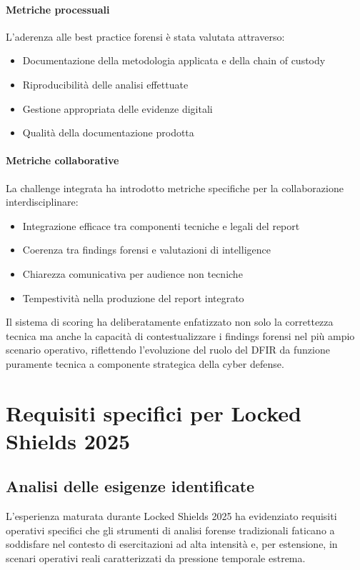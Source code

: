 \paragraph{Metriche processuali}
L'aderenza alle best practice forensi è stata valutata attraverso:
\begin{itemize}
    \item Documentazione della metodologia applicata e della chain of custody
    \item Riproducibilità delle analisi effettuate
    \item Gestione appropriata delle evidenze digitali
    \item Qualità della documentazione prodotta
\end{itemize}

\paragraph{Metriche collaborative}
La challenge integrata ha introdotto metriche specifiche per la collaborazione interdisciplinare:
\begin{itemize}
    \item Integrazione efficace tra componenti tecniche e legali del report
    \item Coerenza tra findings forensi e valutazioni di intelligence
    \item Chiarezza comunicativa per audience non tecniche
    \item Tempestività nella produzione del report integrato
\end{itemize}

Il sistema di scoring ha deliberatamente enfatizzato non solo la correttezza tecnica ma anche la capacità di contestualizzare i findings forensi nel più ampio scenario operativo, riflettendo l'evoluzione del ruolo del DFIR da funzione puramente tecnica a componente strategica della cyber defense.

\section{Requisiti specifici per Locked Shields 2025}

\subsection{Analisi delle esigenze identificate}

L'esperienza maturata durante Locked Shields 2025 ha evidenziato requisiti operativi specifici che gli strumenti di analisi forense tradizionali faticano a soddisfare nel contesto di esercitazioni ad alta intensità e, per estensione, in scenari operativi reali caratterizzati da pressione temporale estrema.

